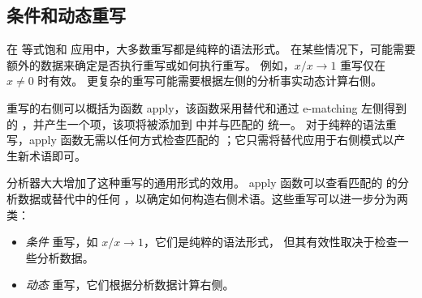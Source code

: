 \subsection{条件和动态重写}
\label{sec:rewrites}

在 等式饱和 应用中，大多数重写都是纯粹的语法形式。
在某些情况下，可能需要额外的数据来确定是否执行重写或如何执行重写。
例如，$x / x \to 1$ 重写仅在 $x \neq 0$ 时有效。
更复杂的重写可能需要根据左侧的分析事实动态计算右侧。

重写的右侧可以概括为函数 \textsf{apply}，该函数采用替代和通过 e-matching 左侧得到的 \eclass，并产生一个项，该项将被添加到 \egraph 中并与匹配的 \eclass 统一。
对于纯粹的语法重写，\textsf{apply} 函数无需以任何方式检查匹配的 \eclass；它只需将替代应用于右侧模式以产生新术语即可。

\eclass 分析器大大增加了这种重写的通用形式的效用。
\textsf{apply} 函数可以查看匹配的 \eclass 的分析数据或替代中的任何 \eclasses，以确定如何构造右侧术语。这些重写可以进一步分为两类：
\begin{itemize}
  \item \textit{条件} 重写，如 $x / x \to 1$，它们是纯粹的语法形式，
    但其有效性取决于检查一些分析数据。
  \item \textit{动态} 重写，它们根据分析数据计算右侧。
\end{itemize}

